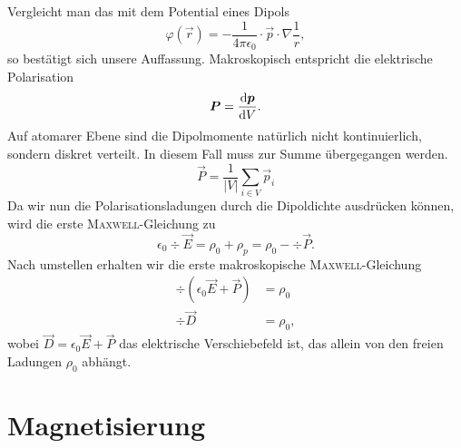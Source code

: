 Vergleicht man das mit dem Potential eines Dipols
\begin{equation*}
\varphi(\vec{r})=-\frac{1}{4\pi\epsilon_0}\cdot\vec{p}\cdot\nabla\frac{1}{r},
\end{equation*}
so bestätigt sich unsere Auffassung. Makroskopisch entspricht die elektrische Polarisation
\begin{equation*}
\bm{P} = \frac{\mathrm{d}{\bm{p}}}{\mathrm{d}{V}}.
\end{equation*}
Auf atomarer Ebene sind die Dipolmomente natürlich nicht kontinuierlich, sondern diskret verteilt. In diesem Fall muss zur Summe übergegangen werden.
\begin{equation*}
\vec{P} = \frac{1}{|V|}\sum\limits_{i\in V}\vec{p}_i
\end{equation*}
Da wir nun die Polarisationsladungen durch die Dipoldichte ausdrücken können, wird die erste \textsc{Maxwell}-Gleichung zu
\begin{equation*}
\epsilon_0\div\vec{E}=\rho_0+\rho_p = \rho_0 - \div\vec{P}.
\end{equation*}
Nach umstellen erhalten wir die erste makroskopische \textsc{Maxwell}-Gleichung
\begin{align*}
\div\left(\epsilon_0\vec{E}+\vec{P}\right)&=\rho_0\\
\div\vec{D} &= \rho_0 ,
\end{align*}
wobei $\vec{D} = \epsilon_0\vec{E} +\vec{P}$ das elektrische Verschiebefeld ist, das allein von den freien Ladungen $\rho_0$ abhängt.

\section{Magnetisierung}

